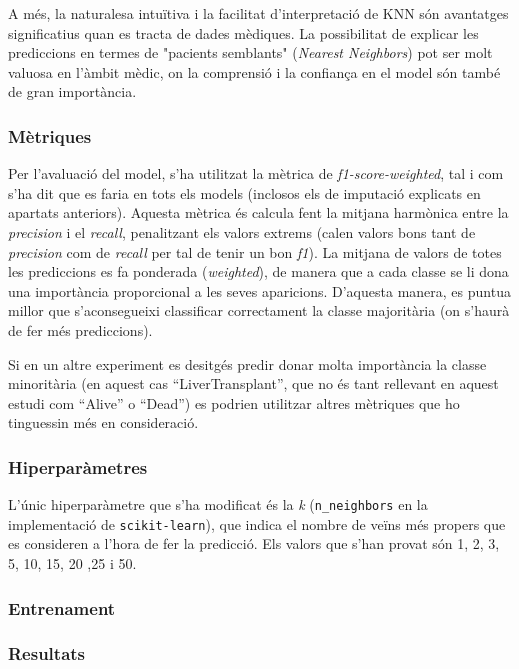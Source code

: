 A més, la naturalesa intuïtiva i la facilitat d'interpretació de KNN són avantatges significatius quan es tracta de dades mèdiques. La possibilitat de explicar les prediccions en termes de "pacients semblants" (\textit{Nearest Neighbors}) pot ser molt valuosa en l'àmbit mèdic, on la comprensió i la confiança en el model són també de gran importància.

\subsubsection{Mètriques}
Per l'avaluació del model, s'ha utilitzat la mètrica de \textit{f1-score-weighted}, tal i com s'ha dit que es faria en tots els models (inclosos els de imputació explicats en apartats anteriors). Aquesta mètrica és calcula fent la mitjana harmònica entre la \textit{precision} i el \textit{recall}, penalitzant els valors extrems (calen valors bons tant de \textit{precision} com de \textit{recall} per tal de tenir un bon \textit{f1}). La mitjana de valors de totes les prediccions es fa ponderada (\textit{weighted}), de manera que a cada classe se li dona una importància proporcional a les seves aparicions. D'aquesta manera, es puntua millor que s'aconsegueixi classificar correctament la classe majoritària (on s'haurà de fer més prediccions). 

Si en un altre experiment es desitgés predir donar molta importància la classe minoritària (en aquest cas ``LiverTransplant'', que no és tant rellevant en aquest estudi com ``Alive'' o ``Dead'') es podrien utilitzar altres mètriques que ho tinguessin més en consideració.

\subsubsection{Hiperparàmetres}
L'únic hiperparàmetre que s'ha modificat és la \textit{k} (\texttt{n\_neighbors} en la implementació de \texttt{scikit-learn}), que indica el nombre de veïns més propers que es consideren a l'hora de fer la predicció. Els valors que s'han provat són 1, 2, 3, 5, 10, 15, 20 ,25 i 50.

\subsubsection{Entrenament}


\subsubsection{Resultats}


